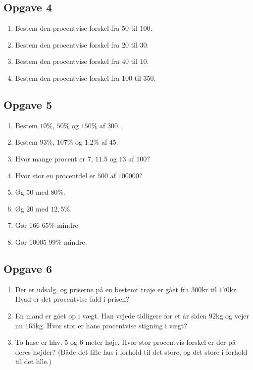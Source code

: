 \subsection*{Opgave 4}

\begin{enumerate}[label=\roman*)]
	\item Bestem den procentvise forskel fra $50$ til $100$.
	\item Bestem den procentvise forskel fra $20$ til $30$.
	\item Bestem den procentvise forskel fra $40$ til $10$.
	\item Bestem den procentvise forskel fra $100$ til $350$.
\end{enumerate}

\subsection*{Opgave 5}
\begin{enumerate}[label=\roman*)]
\item Bestem $10\%$, $50\%$ og $150\%$ af $300$.
\item Bestem $93\%$, $107\%$ og $1.2\%$ af 45.
\item Hvor mange procent er $7$, $11.5$ og $13$ af $100$?
\item Hvor stor en procentdel er $500$ af $100000$?
\item Øg 50 med $80\%$. 
\item Øg 20 med $12,5\%$.
\item Gør 166 65$\%$ mindre
\item Gør 10005 99$\%$ mindre.
\end{enumerate}
\subsection*{Opgave 6}
\begin{enumerate}[label=\roman*)]
\item Der er udsalg, og priserne på en bestemt trøje er gået fra 300kr til $170$kr. Hvad er det procentvise fald i prisen?
\item En mand er gået op i vægt. Han vejede tidligere for et år siden $92$kg og vejer nu $165$kg. Hvor stor er hans procentvise stigning i vægt?
\item  To huse er  hhv. 5 og 6 meter høje. Hvor stor procentvis forskel er der på deres højder? (Både det lille hus i forhold til det store, og det store i forhold til det lille.)
\end{enumerate}

